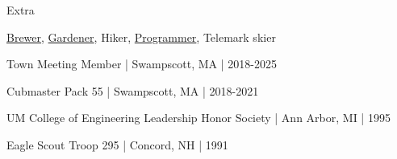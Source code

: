 \documentclass{resume}
\begin{document}
\begin{rSection}{Extra}
\item \href{https://48bottles.com}{Brewer}, \href{https://www.tiktok.com/@growherbert}{Gardener}, Hiker, \href{https://github.com/terryg}{Programmer}, Telemark skier
\item Town Meeting Member | Swampscott, MA | 2018-2025
\item Cubmaster Pack 55 | Swampscott, MA | 2018-2021
\item UM College of Engineering Leadership Honor Society | Ann Arbor, MI | 1995
\item Eagle Scout Troop 295 | Concord, NH | 1991
\end{rSection}
\end{document}
